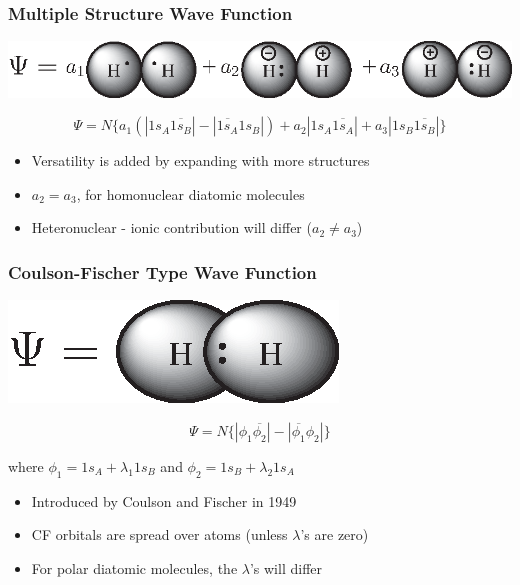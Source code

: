\documentclass[]{beamer}
\begin{document}
\begin{frame}
  \frametitle{Multiple Structure Wave Function}
  \begin{center}
    \includegraphics[scale=0.95]{figures/heitlerplus.eps}
  \end{center}
  \begin{equation*}
    \Psi= N \{ a_1(|1s_{A}\overline{1s_{B}}| - |\overline{1s_{A}}1s_{B}|) + a_2 |1s_{A}\overline{1s_{A}}| + a_3 |1s_{B}\overline{1s_{B}}| \}
  \end{equation*}
  \begin{itemize}
    \item {Versatility is added by expanding with more structures}
    \item {$a_2 = a_3$, for homonuclear diatomic molecules}
    \item {Heteronuclear - ionic contribution will differ ($a_2 \neq a_3$)}
  \end{itemize}
\end{frame}

\begin{frame}
  \frametitle{Coulson-Fischer Type Wave Function}
  \begin{center}  
    \includegraphics{figures/coulson.eps}
  \end{center}
  \begin{equation*}
    \Psi = N \{ | \phi_1 \overline{\phi_2} | - | \overline{\phi_1} \phi_2 | \}
  \end{equation*}
  \begin{center}
    where $\phi_1 = 1s_A + \lambda_1 1s_B$ and $\phi_2 = 1s_B + \lambda_2 1s_A$
  \end{center}  
  \begin{itemize}
    \item {Introduced by Coulson and Fischer in 1949}
    \item {CF orbitals are spread over atoms (unless $\lambda$'s are zero)}
    \item {For polar diatomic molecules, the $\lambda$'s will differ}
  \end{itemize}
\end{frame}
\end{document}
